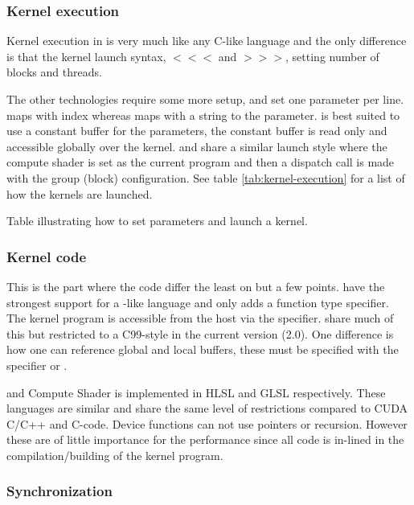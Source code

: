 \subsubsection{Kernel execution}

Kernel execution in {\CU} is very much like any C-like language and the only difference is that the kernel launch syntax, $<<<$ and $>>>$, setting number of blocks and threads.

The other technologies require some more setup, {\OCL} and {\GL} set one parameter per line. {\OCL} maps with index whereas {\GL} maps with a string to the parameter. {\DX} is best suited to use a constant buffer for the parameters, the constant buffer is read only and accessible globally over the kernel. {\DX} and {\GL} share a similar launch style where the compute shader is set as the current program and then a dispatch call is made with the group (block) configuration. See table \ref{tab:kernel-execution} for a list of how the kernels are launched.

\begin{table}[H]
	\centering
	
	\caption{Table illustrating how to set parameters and launch a kernel.}
	\label{tab:kernel-execution}
\end{table}

\subsubsection{Kernel code}

This is the part where the code differ the least on but a few points. {\CU} have the strongest support for a {\CPP} -like language and only adds a function type specifier. The kernel program is accessible from the host via the  specifier. {\OCL} share much of this but restricted to a C99-style in the current version (2.0). One difference is how one can reference global and local buffers, these must be specified with the specifier  or .

{\DX} and {\GL} Compute Shader is implemented in \gls{HLSL} and \gls{GLSL} respectively. These languages are similar and share the same level of restrictions compared to CUDA C/C++ and {\OCL} C-code. Device functions can not use pointers or recursion. However these are of little importance for the performance since all code is in-lined in the compilation/building of the kernel program.

\subsubsection{Synchronization}


